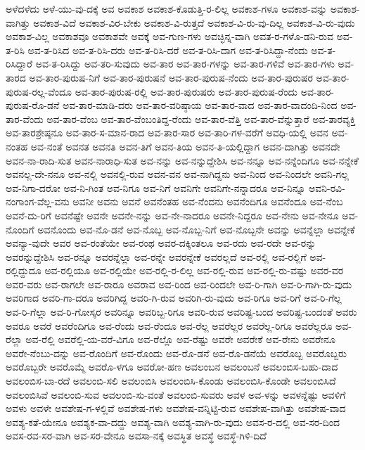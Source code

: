 ಅಳೆದಳೆದು
ಅಳೆ-ಯು-ವು-ದಕ್ಕೆ
ಅವ
ಅವಕಾಶ
ಅವಕಾಶ-ಕೊಡುತ್ತಿ-ರ-ಲಿಲ್ಲ
ಅವಕಾಶ-ಗಳೂ
ಅವಕಾಶ-ವನ್ನು
ಅವಕಾಶ-ವಾಗಿತ್ತು
ಅವಕಾಶ-ವಿದೆ
ಅವಕಾಶ-ವಿರ-ಬೇಕು
ಅವಕಾಶ-ವಿ-ರುತ್ತದೆ
ಅವಕಾಶ-ವಿ-ರು-ವು-ದಿಲ್ಲ
ಅವಕಾಶ-ವಿ-ರು-ವುದು
ಅವಕಾಶ-ವಿಲ್ಲ
ಅವಕಾಶವೂ
ಅವಕಾಶವೇ
ಅವಕ್ಕೆ
ಅವ-ಗುಣ-ಗಳು
ಅವಚ್ಛಿನ್ನ-ವಾಗಿ
ಅವತ-ರ-ಗಳೊ-ಡನಿ-ರುವ
ಅವ-ತ-ರಿಸಿ
ಅವ-ತ-ರಿಸಿದ
ಅವ-ತ-ರಿಸಿ-ದರು
ಅವ-ತ-ರಿಸಿ-ದರೆ
ಅವ-ತ-ರಿಸಿ-ದಾಗ
ಅವ-ತ-ರಿಸಿದ್ದಾ-ನೆಂದು
ಅವ-ತ-ರಿಸಿದ್ದಾರೆ
ಅವ-ತ-ರಿಸಿದ್ದು
ಅವ-ತರಿ-ಸುವುದು
ಅವ-ತಾರ
ಅವ-ತಾರ-ಗಳನ್ನು
ಅವ-ತಾರ-ಗಳಿವೆ
ಅವ-ತಾರ-ಗಳು
ಅವ-ತಾರದ
ಅವ-ತಾರ-ಪುರುಷ-ನಿಗೆ
ಅವ-ತಾರ-ಪುರುಷನೆ
ಅವ-ತಾರ-ಪುರುಷ-ನೆಂದು
ಅವ-ತಾರ-ಪುರುಷರ
ಅವ-ತಾರ-ಪುರುಷ-ರಲ್ಲ-ವೆಂದೂ
ಅವ-ತಾರ-ಪುರುಷ-ರಲ್ಲಿ
ಅವ-ತಾರ-ಪುರುಷರು
ಅವ-ತಾರ-ಪುರುಷ-ರೆಂದು
ಅವ-ತಾರ-ಪುರುಷ-ರೊ-ಡನೆ
ಅವ-ತಾರ-ಮಾಡಿ-ದರು
ಅವ-ತಾರ-ವರಿಷ್ಠಾಯ
ಅವ-ತಾರ-ವಾದ
ಅವ-ತಾರ-ವಾದಂದಿ-ನಿಂದ
ಅವ-ತಾರ-ವೆಂದು
ಅವ-ತಾರ-ವೆಂಬ
ಅವ-ತಾರ-ವೆಂಬಂತಿದ್ದ-ರೆಂದು
ಅವ-ತಾರ-ವೆತ್ತಿ
ಅವ-ತಾರ-ವೆನ್ನುತ್ತಾರೆ
ಅವ-ತಾರವ್ಯಕ್ತಿ
ಅವ-ತಾರಶ್ರೇಷ್ಠನೂ
ಅವ-ತಾರ-ಸ-ಮಾನ-ರಾದ
ಅವ-ತಾರ-ಸಾರ
ಅವ-ತಾರಿ-ಗಳ-ವರೆಗೆ
ಅವಧಿ-ಯಲ್ಲಿ
ಅವನ
ಅವ-ನಂತಹ
ಅವ-ನಂತೆ
ಅವನತ
ಅವನತಿ
ಅವನ-ತಿಗೆ
ಅವನ-ತಿಯ
ಅವನ-ತಿ-ಯಲ್ಲಿದ್ದಾಗ
ಅವನ-ದಾಗಿತ್ತು
ಅವನದೇ
ಅವನ-ನಾ-ರಾದಿ-ಸುತ
ಅವನ-ನಾರಾಧಿ-ಸುತ
ಅವ-ನನ್ನು
ಅವ-ನನ್ನುದ್ದೇಶಿಸಿ
ಅವ-ನನ್ನೂ
ಅವ-ನನ್ನೆಂದಿಗೂ
ಅವ-ನನ್ನೇಕೆ
ಅವನಲ್ಲ-ದೇ-ನನೂ
ಅವ-ನಲ್ಲಿ
ಅವನಲ್ಲಿ-ರುವ
ಅವನ-ವನ
ಅವ-ನಾಗಿದ್ದನು
ಅವ-ನಿಂದ
ಅವ-ನಿಂದಲೇ
ಅವನಿ-ಗಲ್ಲ
ಅವ-ನಿಗಾ-ದರೋ
ಅವ-ನಿ-ಗಿಂತ
ಅವ-ನಿಗೂ
ಅವ-ನಿಗೆ
ಅವನಿಗೇ
ಅವನಿಗೇ-ನನ್ನಾದರೂ
ಅವ-ನಿನ್ನೂ
ಅವನಿ-ರವಿ-ನಂಗಾಂಗ-ವೆಲ್ಲ-ವನು
ಅವನೀ
ಅವನು
ಅವನೆ
ಅವನೆಂತಹ
ಅವ-ನೆಂದನು
ಅವನೆಂದಿಗೂ
ಅವನೆಂದೂ
ಅವ-ನೆಂಬ
ಅವನೆ-ದು-ರಿಗೆ
ಅವನೆಷ್ಟೇ
ಅವನೇ
ಅವನೇ-ನನ್ನು
ಅವ-ನೇ-ನಾದರೂ
ಅವನೇ-ನಿದ್ದರೂ
ಅವ-ನೇನು
ಅವ-ನೇನೂ
ಅವ-ನೊಂದಿಗೆ
ಅವನೊಂದು
ಅವ-ನೊ-ಡನೆ
ಅವ-ನೊಬ್ಬ
ಅವ-ನೊಬ್ಬ-ನಿಗೆ
ಅವ-ನೊಬ್ಬನೇ
ಅವನ್ನು
ಅವನ್ನೆಲ್ಲಾ
ಅವನ್ನೇಕೆ
ಅವನ್ಯಾ-ವುದೇ
ಅವರ
ಅವ-ರಂತೆಯೇ
ಅವ-ರಂಥ
ಅವರ-ದಕ್ಕಿಂತಲೂ
ಅವ-ರದು
ಅವ-ರದೇ
ಅವ-ರನ್ನು
ಅವರನ್ನುದ್ದೇಶಿಸಿ
ಅವ-ರನ್ನೂ
ಅವರನ್ನೆಲ್ಲಾ
ಅವ-ರನ್ನೇ
ಅವರನ್ನೇಕೆ
ಅವರಲ್ಲದೆ
ಅವ-ರಲ್ಲಿ
ಅವ-ರಲ್ಲಿಗೆ
ಅವ-ರಲ್ಲಿದ್ದುದೂ
ಅವ-ರಲ್ಲಿಯೂ
ಅವ-ರಲ್ಲಿಯೇ
ಅವ-ರಲ್ಲಿ-ರ-ಲಿಲ್ಲ
ಅವ-ರಲ್ಲಿ-ರುವ
ಅವ-ರಲ್ಲಿ-ರು-ವಷ್ಟು
ಅವರ-ವರ
ಅವರ-ವರು
ಅವ-ರಾಗಲೇ
ಅವ-ರಾರೂ
ಅವರಾವ
ಅವ-ರಿಂದ
ಅವ-ರಿಂದಲೇ
ಅವ-ರಿ-ಗಾಗಿ
ಅವ-ರಿ-ಗಾಗಿ-ರು-ವುದು
ಅವರಿಗಾದ
ಅವರಿ-ಗಾ-ದರೂ
ಅವರಿಗಿದ್ದ
ಅವರಿ-ಗಿ-ರುವ
ಅವರಿಗಿ-ರು-ವುದು
ಅವ-ರಿಗೂ
ಅವ-ರಿಗೆ
ಅವ-ರಿ-ಗೆಲ್ಲ
ಅವ-ರಿ-ಗೆಲ್ಲಾ
ಅವ-ರಿ-ಗೋಸ್ಕರ
ಅವರಿನ್ನೂ
ಅವರಿಬ್ಬ-ರಿಗೂ
ಅವರಿ-ರುವ
ಅವರಿಷ್ಟ-ಬಂದ
ಅವರಿಷ್ಟ-ಬಂದಂತೆ
ಅವರು
ಅವರೂ
ಅವರೆ
ಅವರೆಂದಿಗೂ
ಅವ-ರೆಂದು
ಅವ-ರೆಂದೂ
ಅವ-ರೆಲ್ಲ
ಅವರೆಲ್ಲರ
ಅವರೆಲ್ಲ-ರಿಗೂ
ಅವರೆಲ್ಲರೂ
ಅವ-ರೆಲ್ಲಾ
ಅವ-ರೆಲ್ಲಿ
ಅವರೆಲ್ಲಿ-ಯ-ವರೆ-ವಿಗೂ
ಅವ-ರೆಲ್ಲೊ
ಅವ-ರೆಷ್ಟು
ಅವರೇ
ಅವರೇಕೆ
ಅವ-ರೇನು
ಅವರೇನೂ
ಅವರೇ-ನೆಂಬು-ದನ್ನು
ಅವ-ರೊಂದಿಗೆ
ಅವ-ರೊಂದು
ಅವ-ರೊ-ಡನೆ
ಅವ-ರೊ-ಡನೆಯೆ
ಅವರೊಬ್ಬ
ಅವರೊಬ್ಬರು
ಅವರೊಬ್ಬರೇ
ಅವರೊಮ್ಮೆ
ಅವರೊ-ಳಗೂ
ಅವರೋ-ಹಣ
ಅವಲಂಬನ
ಅವಲಂಬನೆ
ಅವಲಂಬಿಸ-ಬಹು-ದಾದ
ಅವಲಂಬಿಸ-ಬಾ-ರದೆ
ಅವಲಂಬಿ-ಸಲಿ
ಅವಲಂಬಿಸಿ
ಅವಲಂಬಿಸಿ-ಕೊಂಡು
ಅವಲಂಬಿಸಿ-ಕೊಂಡೇ
ಅವಲಂಬಿಸಿದೆ
ಅವಲಂಬಿಸಿವೆ
ಅವಲಂಬಿ-ಸುವ
ಅವಲಂಬಿ-ಸು-ವಂತೆ
ಅವಲಂಬಿ-ಸುವರು
ಅವಳ
ಅವ-ಳನ್ನು
ಅವಳನ್ನೆಷ್ಟು
ಅವಳಿಗೆ
ಅವಳು
ಅವಳೇ
ಅವಶೇಷ-ಗ-ಳಲ್ಲಿವೆ
ಅವಶೇಷ-ಗಳು
ಅವಶೇಷ-ವನ್ನಿಟ್ಟಿ-ರುವ
ಅವಶೇಷ-ವಾಗಿತ್ತು
ಅವಶೇಷ-ವಾದ
ಅವಶ್ಯ-ಕತೆ-ಯೇನೂ
ಅವಶ್ಯಕ-ವಾ-ದದ್ದು
ಅವಶ್ಯ-ವಾಗಿ
ಅವಶ್ಯ-ವಾಗಿ-ರು-ವುದು
ಅವಸ-ರ-ದಲ್ಲಿ
ಅವ-ಸರ-ದಿಂದ
ಅವಸ-ರವ-ಸರ-ವಾಗಿ
ಅವ-ಸರ-ವೇನೂ
ಅವಸಾ-ನಕ್ಕೆ
ಅವಸ್ಥಿತ
ಅವಸ್ಥೆ
ಅವಸ್ಥೆ-ಗಿಳಿ-ದಿದೆ
